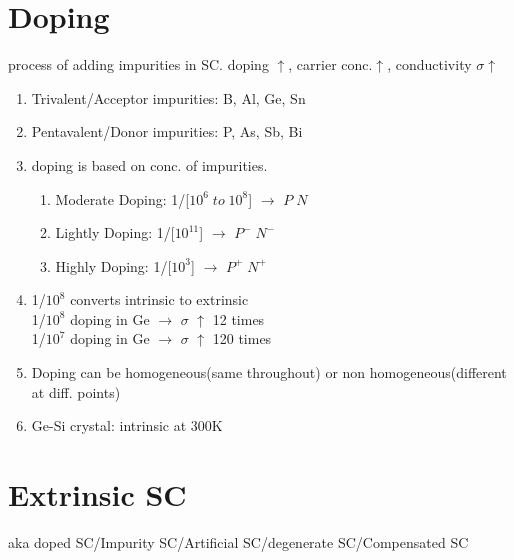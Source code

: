 \documentclass[10pt, a4paper]{report}
\begin{document}
	\section{Doping}
	process of adding impurities in SC. doping $\uparrow$, carrier conc.$\uparrow$, conductivity $\sigma$$\uparrow$
	\begin{enumerate}
		\item Trivalent/Acceptor impurities: B, Al, Ge, Sn
		\item Pentavalent/Donor impurities: P, As, Sb, Bi
		\item doping is based on conc. of impurities.
		\begin{enumerate}
			\item Moderate Doping: 1/[$ 10^6 \; to\; 10^8 $] $\rightarrow$ $ P\; N $
			\item Lightly Doping: 1/[$ 10^11$] $\rightarrow$ $ P^-\; N^- $
			\item Highly Doping: 1/[$ 10^3 $] $\rightarrow$ $ P^+\; N^+ $
		\end{enumerate}
		\item 1/$ 10^8 $ converts intrinsic to extrinsic \\
		1/$ 10^8 $ doping in Ge $\rightarrow$ $\sigma$ $\uparrow$ 12 times \\
		1/$ 10^7 $ doping in Ge $\rightarrow$ $\sigma$ $\uparrow$ 120 times
		\item Doping can be homogeneous(same throughout) or non homogeneous(different at diff. points)
		\item Ge-Si crystal: intrinsic at 300K
	\end{enumerate}
	\section{Extrinsic SC}
	aka doped SC/Impurity SC/Artificial SC/degenerate SC/Compensated SC \\
\end{document}
